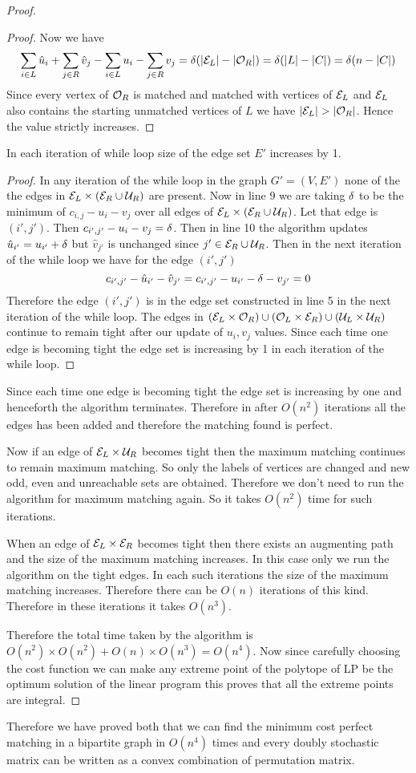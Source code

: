 \documentclass[twoside]{article}
\begin{document}
\begin{proof}
\begin{claimwidth}
\begin{proof}
			Now we have $$
			\sum\limits_{i\in L}\hat{u}_i+\sum\limits_{j\in R}\hat{v}_j-\sum\limits_{i\in L}u_i-\sum\limits_{j\in R}v_j=\delta(|\mathcal{E}_L|-|\mathcal{O}_R|)=\delta(|L|-|C|)=\delta(n-|C|)$$
			Since every vertex of $\mathcal{O}_R$ is matched and matched with vertices of $\mathcal{E}_L$ and $\mathcal{E}_L$ also contains the starting unmatched vertices of $L$ we have $|\mcE_L|>|\mcO_R|$. Hence the value strictly increases.
		\end{proof}
		\begin{claim}{}{}
			In each iteration of while loop size of the edge set $E'$ increases by 1.
		\end{claim}
		\begin{proof}
			In any iteration of the while loop in the graph $G'=(V,E')$ none of the the edges in $\mathcal{E}_L\times (\mathcal{E}_R\cup \mathcal{U}_R)$ are present. Now in line 9 we are taking $\delta$ to be the minimum of $c_{i,j}-u_i-v_j$ over all edges of $\mathcal{E}_L\times (\mathcal{E}_R\cup \mathcal{U}_R)$. Let that edge is $(i',j')$. Then $c_{i',j'}-u_i-v_j=\delta$. Then in line 10 the algorithm updates $\hat{u}_{i'}=u_{i'}+\delta$ but $\hat{v}_{j'}$ is unchanged since $j'\in \mathcal{E}_R\cup\mathcal{U}_R$. Then in the next iteration of the while loop we have for the edge $(i',j')$ $$c_{i',j'}-\hat{u}_{i'}-\hat{v}_{j'}=c_{i',j'}-u_{i'}-\delta-v_{j'}=0$$Therefore the edge $(i',j')$ is in the edge set constructed in line 5 in the next iteration of the while loop. The edges in $(\mathcal{E}_L\times \mathcal{O}_R)\cup (\mathcal{O}_L\times \mathcal{E}_R)\cup (\mathcal{U}_L\times \mathcal{U}_R)$ continue to remain tight after our update of $u_i,v_j$ values. Since each time one edge is becoming tight the edge set is increasing by 1 in each iteration of the while loop.
		\end{proof}
	\end{claimwidth}
	Since each time one edge is becoming tight the edge set is increasing by one and henceforth the algorithm terminates. Therefore in after $O(n^2)$  iterations all the edges has been added and therefore the  matching found is perfect. 

Now if an edge of $\mathcal{E}_L\times\mathcal{U}_R$ becomes tight then the maximum matching continues to remain maximum matching. So only the labels of vertices are changed and new odd, even and unreachable sets are obtained. Therefore we don't need to run the algorithm for maximum matching again.  So it takes $O(n^2)$ time for such iterations. 

When an edge of $\mathcal{E}_L\times\mathcal{E}_R$ becomes tight then there exists an augmenting path and the size of the maximum matching increases. In this case only we run the  algorithm on the tight edges. In each such iterations  the size of the maximum matching increases. Therefore there can be $O(n)$ iterations of this kind. Therefore in these iterations it takes $O(n^3)$. 

Therefore the total time taken by the algorithm is $O(n^2)\times O(n^2)+O(n)\times O(n^3)=O(n^4)$. Now since carefully choosing the cost function we can make any extreme point of the polytope of LP be the optimum solution of the linear program this proves that all the extreme points are integral.
\end{proof}



Therefore we have proved both that we can find the minimum cost perfect matching in a bipartite graph in $O(n^4)$ times and every doubly stochastic matrix can be written as a convex combination of permutation matrix.
\end{document}

